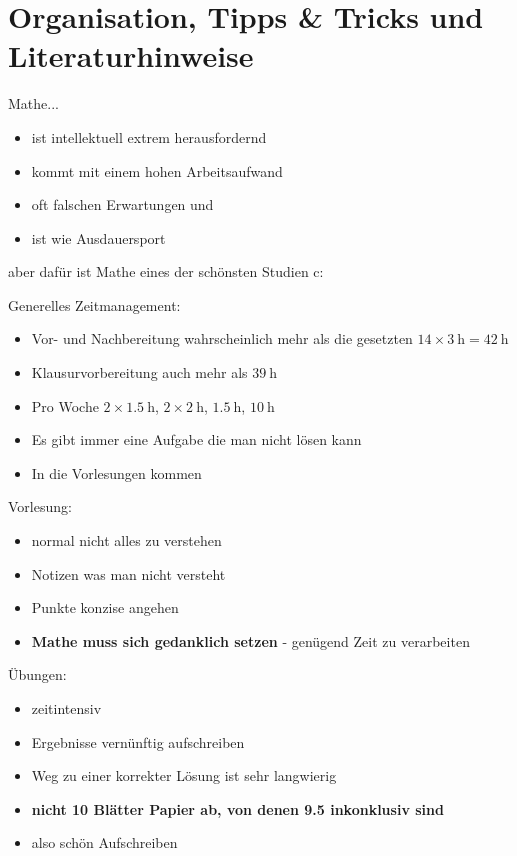 \documentclass[consecutivenumbering]{gadsescript}
\begin{document}
\maketitle

\section*{Organisation, Tipps \& Tricks und Literaturhinweise}

Mathe...
\begin{itemize}
	\item ist intellektuell extrem herausfordernd
	\item kommt mit einem hohen Arbeitsaufwand
	\item oft falschen Erwartungen und
	\item ist wie Ausdauersport
\end{itemize}

aber dafür ist Mathe eines der  schönsten Studien c:

Generelles Zeitmanagement:
\begin{itemize}
	\item Vor- und Nachbereitung wahrscheinlich mehr als die gesetzten $14 \times \qty{3}{\hour} = \qty{42}{\hour}$
	\item Klausurvorbereitung auch mehr als $\qty{39}{\hour}$
	\item Pro Woche $ 2 \times \qty{1.5}{\hour}$, $2 \times \qty{2}{\hour} $, $ \qty{1.5}{\hour} $, $ \qty{10}{\hour} $
	\item Es gibt immer eine Aufgabe die man nicht lösen kann
	\item In die Vorlesungen kommen
\end{itemize}

Vorlesung:
\begin{itemize}
	\item normal nicht alles zu verstehen
	\item Notizen was man nicht versteht
	\item Punkte konzise angehen
	\item \textbf{Mathe muss sich gedanklich setzen} - genügend Zeit zu verarbeiten
\end{itemize}

Übungen:
\begin{itemize}
	\item zeitintensiv
	\item Ergebnisse vernünftig aufschreiben
	\item Weg zu einer korrekter Lösung ist sehr langwierig
	\item \textbf{nicht 10 Blätter Papier ab, von denen 9.5 inkonklusiv sind}
	\item also schön Aufschreiben
\end{itemize}
\end{document}
